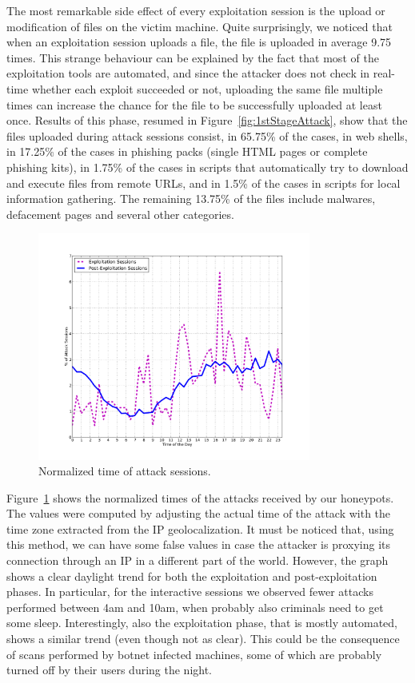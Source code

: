 The most remarkable side effect of every exploitation session is the upload or modification of files on the victim machine. Quite surprisingly, we noticed that when an exploitation session uploads a file, the file is uploaded in average 9.75 times. This strange behaviour can be explained by the fact that most of the exploitation tools are automated, and since the attacker does not check in real-time whether each exploit succeeded or not, uploading the same file multiple times can increase the chance for the file to be successfully uploaded at least once. Results of this phase, resumed in Figure~\ref{fig:1stStageAttack}, show that the files uploaded during attack sessions consist, in 65.75\% of the cases, in web shells, in 17.25\% of the cases in phishing packs (single HTML pages or complete phishing kits), in 1.75\% of the cases in scripts that automatically try to download and execute files from remote URLs, and in 1.5\% of the cases in scripts for local information gathering. The remaining 13.75\% of the files include malwares, defacement pages and several other categories.

\begin{figure}[tbh]
\centerline{\includegraphics[width=0.8\textwidth]{Images/normalizedAttackTimes.png}}
\caption{Normalized time of attack sessions.\label{fig:normalizedAttackTimes}}
\end{figure}

Figure~\ref{fig:normalizedAttackTimes} shows the normalized times of the attacks received by our honeypots. The values were computed by adjusting the actual time of the attack with the time zone extracted from the IP geolocalization. It must be noticed that, using this method, we can have some false values in case the attacker is proxying its connection through an IP in a different part of the world. However, the graph shows a clear daylight trend for both the exploitation and post-exploitation phases. In particular, for the interactive sessions we observed fewer attacks performed between 4am and 10am, when probably also criminals need to get some sleep. Interestingly, also the exploitation phase, that is mostly automated, shows a similar trend (even though not as clear). This could be the consequence of scans performed by botnet infected machines, some of which are probably turned off by their users during the night.


